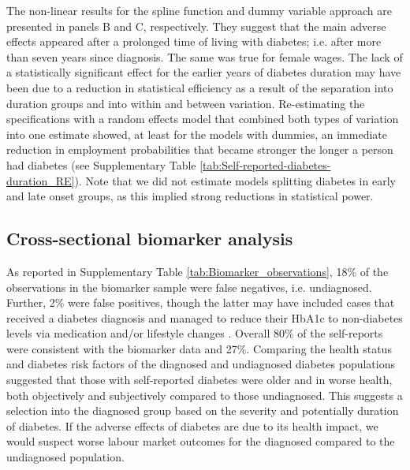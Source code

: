 \documentclass[12pt,english]{article}
\begin{document}
The non-linear results for the spline function and dummy variable approach are presented in panels B and C, respectively. They suggest that the main adverse effects appeared after a prolonged time of living with diabetes; i.e. after more than seven years since diagnosis. The same was true for female wages. The lack of a statistically significant effect for the earlier years of diabetes duration may have been due to a reduction in statistical efficiency as a result of the separation into duration groups and into within and between variation. Re-estimating the specifications with a random effects model that combined both types of variation into one estimate showed, at least for the models with dummies, an immediate reduction in employment probabilities that became stronger the longer a person had diabetes (see Supplementary Table \ref{tab:Self-reported-diabetes-duration_RE}). Note that we did not estimate models splitting diabetes in early and late onset groups, as this implied strong reductions in statistical power.

\FloatBarrier

\subsection{Cross-sectional biomarker analysis}


As reported in Supplementary Table \ref{tab:Biomarker_observations}, 18\% of the observations in the biomarker sample were false negatives, i.e. undiagnosed. Further, 2\% were false positives, though the latter may have included cases that received a diabetes diagnosis and managed to reduce their \ac{HbA1c} to non-diabetes levels via medication and/or lifestyle changes \parencite{Flores-Hernandez2015}. Overall 80\% of the self-reports were consistent with the biomarker data and 27\%. Comparing the health status and diabetes risk factors of the diagnosed and undiagnosed diabetes populations suggested that those with self-reported diabetes were older and in worse health, both objectively and subjectively compared to those undiagnosed. This suggests a selection into the diagnosed group based on the severity and potentially duration of diabetes. If the adverse effects of diabetes are due to its health impact, we would suspect worse labour market outcomes for the diagnosed compared to the undiagnosed population.
\end{document}
